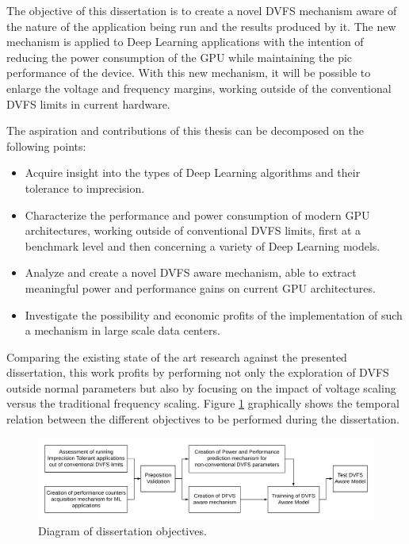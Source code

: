 The objective of this dissertation is to create a novel DVFS mechanism aware of the nature of the application being run and the results produced by it. The new mechanism is applied to Deep Learning applications with the intention of reducing the power consumption of the GPU while maintaining the pic performance of the device. With this new mechanism, it will be possible to enlarge the voltage and frequency margins, working outside of the conventional DVFS limits in current hardware. 


The aspiration and contributions of this thesis can be decomposed on the following points:
\begin{itemize}
\item Acquire insight into the types of Deep Learning algorithms and their tolerance to imprecision.
\item Characterize the performance and power consumption of modern GPU architectures, working outside of conventional DVFS limits, first at a benchmark level and then concerning a variety of Deep Learning models.
\item Analyze and create a novel DVFS aware mechanism, able to extract meaningful power and performance gains on current GPU architectures.
\item Investigate the possibility and economic profits of the implementation of such a mechanism in large scale data centers.
\end{itemize}

Comparing the existing state of the art research against the presented dissertation, this work profits by performing not only the exploration of DVFS outside normal parameters but also by focusing on the impact of voltage scaling versus the traditional frequency scaling.  Figure \ref{fig:thesisObj} graphically shows the temporal relation between the different objectives to be performed during the dissertation.


\begin{figure}[!htb]
  \centering
  \includegraphics[width=1\textwidth]{Figures/Introduction/Dissertation_Objectives.png}
  \caption{Diagram of dissertation objectives.}
  \label{fig:thesisObj}
\end{figure}

